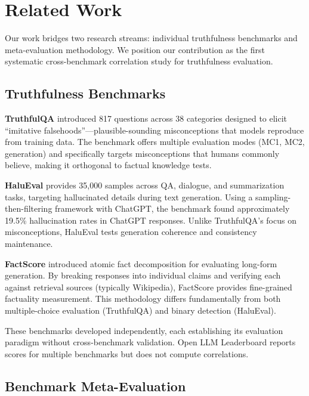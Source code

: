 \section{Related Work}
\label{sec:related}

Our work bridges two research streams: individual truthfulness benchmarks and meta-evaluation methodology. We position our contribution as the first systematic cross-benchmark correlation study for truthfulness evaluation.

\subsection{Truthfulness Benchmarks}

\textbf{TruthfulQA} \cite{lin2022truthfulqa} introduced 817 questions across 38 categories designed to elicit ``imitative falsehoods''---plausible-sounding misconceptions that models reproduce from training data. The benchmark offers multiple evaluation modes (MC1, MC2, generation) and specifically targets misconceptions that humans commonly believe, making it orthogonal to factual knowledge tests.

\textbf{HaluEval} \cite{li2023halueval} provides 35,000 samples across QA, dialogue, and summarization tasks, targeting hallucinated details during text generation. Using a sampling-then-filtering framework with ChatGPT, the benchmark found approximately 19.5\% hallucination rates in ChatGPT responses. Unlike TruthfulQA's focus on misconceptions, HaluEval tests generation coherence and consistency maintenance.

\textbf{FactScore} \cite{min2023factscore} introduced atomic fact decomposition for evaluating long-form generation. By breaking responses into individual claims and verifying each against retrieval sources (typically Wikipedia), FactScore provides fine-grained factuality measurement. This methodology differs fundamentally from both multiple-choice evaluation (TruthfulQA) and binary detection (HaluEval).

These benchmarks developed independently, each establishing its evaluation paradigm without cross-benchmark validation. Open LLM Leaderboard reports scores for multiple benchmarks but does not compute correlations.

\subsection{Benchmark Meta-Evaluation}

